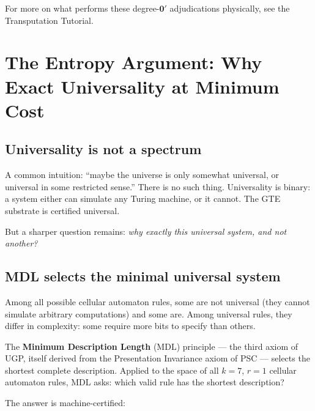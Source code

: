 \documentclass[11pt,a4paper]{article}
\newcommand{\term}[1]{\textbf{#1}}
\begin{document}
For more on what performs these degree-$\mathbf{0}'$ adjudications physically, see the
Transputation Tutorial.

\section{The Entropy Argument: Why Exact Universality at Minimum Cost}

\subsection{Universality is not a spectrum}

A common intuition: ``maybe the universe is only somewhat universal, or universal
in some restricted sense.''  There is no such thing.  Universality is binary: a system
either can simulate any Turing machine, or it cannot.  The GTE substrate is certified
universal.

But a sharper question remains: \emph{why exactly this universal system, and not
another?}

\subsection{MDL selects the minimal universal system}

Among all possible cellular automaton rules, some are not universal (they cannot
simulate arbitrary computations) and some are.  Among universal rules, they differ in
complexity: some require more bits to specify than others.

The \term{Minimum Description Length} (MDL) principle — the third axiom of UGP, itself
derived from the Presentation Invariance axiom of PSC — selects the shortest complete
description.  Applied to the space of all $k=7$, $r=1$ cellular automaton rules,
MDL asks: which valid rule has the shortest description?

The answer is machine-certified:
\end{document}
